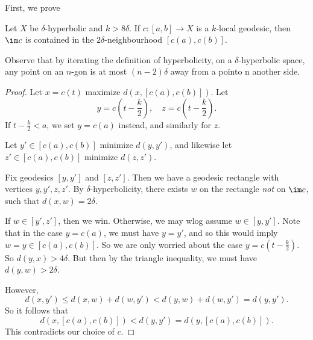 \documentclass[a4paper]{article}
\begin{document}
First, we prove
\begin{lemma}
  Let $X$ be $\delta$-hyperbolic and $k > 8\delta$. If $c: [a, b] \to X$ is a $k$-local geodesic, then $\im c$ is contained in the $2\delta$-neighbourhood $[c(a), c(b)]$.
\end{lemma}
Observe that by iterating the definition of hyperbolicity, on a $\delta$-hyperbolic space, any point on an $n$-gon is at most $(n - 2)\delta$ away from a pointo n another side.

\begin{proof}
  Let $x = c(t)$ maximize $d(x, [c(a), c(b)])$. Let
  \[
    y = c\left(t - \frac{k}{2}\right),\quad z = c\left(t - \frac{k}{2}\right).
  \]
  If $t - \frac{k}{2} < a$, we set $y = c(a)$ instead, and similarly for $z$.

  Let $y' \in [c(a), c(b)]$ minimize $d(y, y')$, and likewise let $z' \in [c(a), c(b)]$ minimize $d(z, z')$.

  Fix geodesics $[y, y']$ and $[z, z']$. Then we have a geodesic rectangle with vertices $y, y', z, z'$. By $\delta$-hyperbolicity, there exists $w$ on the rectangle \emph{not} on $\im c$, such that $d(x, w) = 2 \delta$.

  If $w \in [y', z']$, then we win. Otherwise, we may wlog assume $w \in [y, y']$. Note that in the case $y = c(a)$, we must have $y = y'$, and so this would imply $w = y \in [c(a), c(b)]$. So we are only worried about the case $y = c\left(t - \frac{k}{2}\right)$. So $d(y, x) > 4\delta$. But then by the triangle inequality, we must have $d(y, w) > 2\delta$.

  However,
  \[
    d(x, y') \leq d(x, w) + d(w, y') < d(y, w) + d(w, y') = d(y, y').
  \]
  So it follows that
  \[
    d(x, [c(a), c(b)]) < d(y, y') = d(y, [c(a), c(b)]).
  \]
  This contradicts our choice of $c$.
\end{proof}
\end{document}
